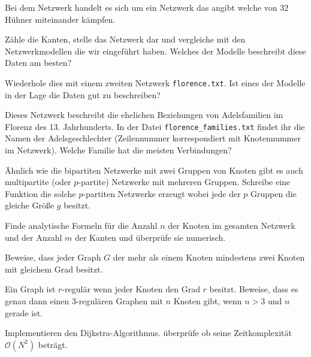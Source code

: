 Bei dem Netzwerk handelt es sich um ein Netzwerk das angibt welche von $32$ H\"uhner miteinander k\"ampfen.

Z\"ahle die Kanten, stelle das Netzwerk dar und vergleiche mit den Netzwerkmodellen die wir eingef\"uhrt haben. Welches der Modelle beschreibt diese Daten am besten?

Wiederhole dies mit einem zweiten Netzwerk {\tt florence.txt}. Ist eines der Modelle in der Lage die Daten gut zu beschreiben?

Dieses Netzwerk beschreibt die ehelichen Beziehungen von Adelsfamilien im Florenz des 13. Jahrhunderts. In der Datei {\tt florence\_families.txt} findet ihr die Namen der Adelsgeschlechter (Zeilennummer korrespondiert mit Knotennummer im Netzwerk). Welche Familie hat die meisten Verbindungen?

\exercise[%
  topic=Zusatzaufgaben
    ]

\subexercise[%
  topic=Multipartite Netzwerke,
    ]
		
\"Ahnlich wie die bipartiten Netzwerke mit zwei Gruppen von Knoten gibt es auch multipartite (oder $p$-partite) Netzwerke mit mehreren Gruppen. Schreibe eine Funktion die solche $p$-partiten Netzwerke erzeugt wobei jede der $p$ Gruppen die gleiche Gr\"o\ss e $g$ besitzt.

Finde analytische Formeln f\"ur die Anzahl $n$ der Knoten im gesamten Netzwerk und der Anzahl $m$ der Kanten und \"uberpr\"ufe sie numerisch.
		
		\subexercise[%
  topic=Knoten mit gleichem Grad,
    ]
		Beweise, dass jeder Graph $G$ der mehr als einem Knoten mindestens zwei Knoten mit gleichem Grad besitzt.
 
\subexercise[%
  topic=$3$-regul\"are Graphen,
    ]
		Ein Graph ist $r$-regul\"ar wenn jeder Knoten den Grad $r$ besitzt. Beweise, dass es genau dann einen $3$-regul\"aren Graphen mit $n$ Knoten gibt, wenn $n>3$ und $n$ gerade ist.
		
		
		\subexercise[%
  topic=Dijkstra-Algorithmus,
    ]
		
		Implementieren den Dijkstra-Algorithmus. \"uberpr\"ufe ob seine Zeitkomplexit\"at $\mathcal{O}(N^2)$ betr\"agt.
		


